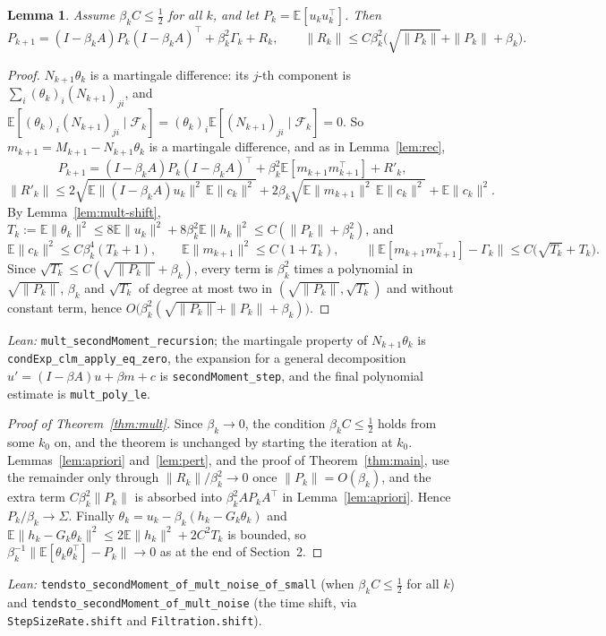 \documentclass[11pt]{article}
\newtheorem{lemma}[theorem]{Lemma}
\theoremstyle{definition}
\theoremstyle{remark}
\newcommand{\E}{\mathbb{E}}
\newcommand{\F}{\mathcal{F}}
\begin{document}
\begin{lemma}\label{lem:mult-rec}
Assume $\beta_kC \le \tfrac12$ for all $k$, and let $P_k = \E[u_ku_k^\top]$. Then
\[
  P_{k+1} = (I - \beta_kA)P_k(I - \beta_kA)^\top + \beta_k^2\Gamma_k + R_k,
  \qquad
  \|R_k\| \le C\beta_k^2\big(\sqrt{\|P_k\|} + \|P_k\| + \beta_k\big).
\]
\end{lemma}
\begin{proof}
$N_{k+1}\theta_k$ is a martingale difference: its $j$-th component is
$\sum_i(\theta_k)_i(N_{k+1})_{ji}$, and $\E[(\theta_k)_i(N_{k+1})_{ji}\mid\F_k]
= (\theta_k)_i\E[(N_{k+1})_{ji}\mid\F_k] = 0$. So $m_{k+1} = M_{k+1} - N_{k+1}\theta_k$ is a
martingale difference, and as in Lemma~\ref{lem:rec},
\[
  P_{k+1} = (I - \beta_kA)P_k(I - \beta_kA)^\top + \beta_k^2\E[m_{k+1}m_{k+1}^\top] + R'_k,
\]
\[
  \|R'_k\| \le 2\sqrt{\E\|(I - \beta_kA)u_k\|^2\,\E\|c_k\|^2} + 2\beta_k\sqrt{\E\|m_{k+1}\|^2\,\E\|c_k\|^2}
    + \E\|c_k\|^2 .
\]
By Lemma~\ref{lem:mult-shift}, $T_k := \E\|\theta_k\|^2 \le 8\E\|u_k\|^2 + 8\beta_k^2\E\|h_k\|^2
\le C(\|P_k\| + \beta_k^2)$, and
\[
  \E\|c_k\|^2 \le C\beta_k^4(T_k + 1),\qquad
  \E\|m_{k+1}\|^2 \le C(1 + T_k),\qquad
  \big\|\E[m_{k+1}m_{k+1}^\top] - \Gamma_k\big\| \le C\big(\sqrt{T_k} + T_k\big).
\]
Since $\sqrt{T_k} \le C(\sqrt{\|P_k\|} + \beta_k)$, every term is $\beta_k^2$ times a polynomial
in $\sqrt{\|P_k\|}$, $\beta_k$ and $\sqrt{T_k}$ of degree at most two in
$(\sqrt{\|P_k\|}, \sqrt{T_k})$ and without constant term, hence
$O\big(\beta_k^2(\sqrt{\|P_k\|} + \|P_k\| + \beta_k)\big)$.
\end{proof}
\noindent\emph{Lean:} \texttt{mult\_secondMoment\_recursion}; the martingale property of
$N_{k+1}\theta_k$ is \texttt{condExp\_clm\_apply\_eq\_zero}, the expansion for a general
decomposition $u' = (I - \beta A)u + \beta m + c$ is \texttt{secondMoment\_step}, and the final
polynomial estimate is \texttt{mult\_poly\_le}.

\begin{proof}[Proof of Theorem~\ref{thm:mult}]
Since $\beta_k \to 0$, the condition $\beta_kC \le \frac12$ holds from some $k_0$ on, and
the theorem is unchanged by starting the iteration at $k_0$. Lemmas~\ref{lem:apriori}
and~\ref{lem:pert}, and the proof of Theorem~\ref{thm:main}, use the remainder only through
$\|R_k\|/\beta_k^2 \to 0$ once $\|P_k\| = O(\beta_k)$, and the extra term
$C\beta_k^2\|P_k\|$ is absorbed into $\beta_k^2AP_kA^\top$ in Lemma~\ref{lem:apriori}. Hence
$P_k/\beta_k \to \Sigma$. Finally $\theta_k = u_k - \beta_k(h_k - G_k\theta_k)$ and
$\E\|h_k - G_k\theta_k\|^2 \le 2\E\|h_k\|^2 + 2C^2T_k$ is bounded, so
$\beta_k^{-1}\|\E[\theta_k\theta_k^\top] - P_k\| \to 0$ as at the end of Section~2.
\end{proof}
\noindent\emph{Lean:} \texttt{tendsto\_secondMoment\_of\_mult\_noise\_of\_small} (when
$\beta_kC \le \frac12$ for all $k$) and \texttt{tendsto\_secondMoment\_of\_mult\_noise}
(the time shift, via \texttt{StepSizeRate.shift} and \texttt{Filtration.shift}).
\end{document}

